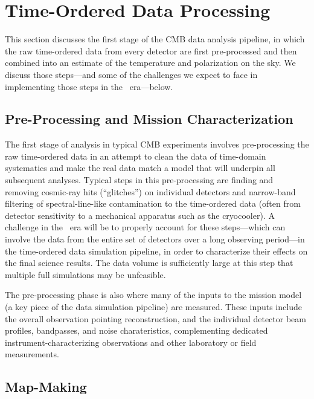  
\section{Time-Ordered Data Processing}

This section discusses the first stage of the CMB data analysis pipeline, in which the raw time-ordered data from every detector are first pre-processed and then combined into an estimate of the temperature and polarization on the sky. We discuss those steps---and some of the challenges we expect to face in implementing those steps in the \cmbexp\ era---below.

\subsection{Pre-Processing and Mission Characterization}

The first stage of analysis in typical CMB experiments involves pre-processing the raw 
time-ordered data in an attempt to clean the data of time-domain systematics and 
make the real data match a model that will underpin all subsequent analyses. Typical 
steps in this pre-processing are finding and removing cosmic-ray hits (``glitches'') on individual detectors
and narrow-band filtering of spectral-line-like contamination to the time-ordered data (often 
from detector sensitivity to a mechanical apparatus such as the cryocooler). 
A challenge in the \cmbexp\ era will be to properly account for these steps---which can involve
the data from the entire set of detectors over a long observing period---in the time-ordered data
simulation pipeline, in order to characterize their effects on the final science results. The data 
volume is sufficiently large at this step that multiple full simulations may be unfeasible.

The pre-processing phase is also where many of the inputs to the mission model (a key piece of the data simulation pipeline) are measured. These inputs include the overall observation pointing reconstruction, and the individual detector beam profiles, bandpasses, and noise charateristics, complementing dedicated instrument-characterizing observations and other laboratory or field measurements.


\subsection{Map-Making}
\label{sec_mapmaking}

